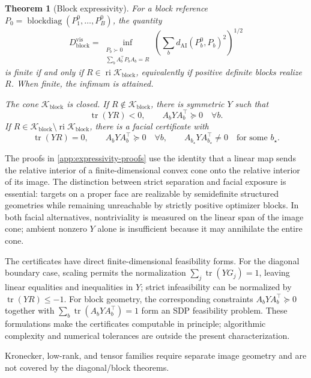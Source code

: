 \documentclass[10pt]{article}
\theoremstyle{plain}
\newtheorem{theorem}{Theorem}[section]
\theoremstyle{definition}
\theoremstyle{remark}
\newcommand{\AI}{\mathrm{AI}}
\newcommand{\tr}{\operatorname{tr}}
\newcommand{\blockdiag}{\operatorname{blockdiag}}
\newcommand{\ri}{\operatorname{ri}}
\newcommand{\dai}{d_{\AI}}
\newcommand{\Kcal}{\mathcal K}
\begin{document}
\begin{theorem}[Block expressivity]
\label{thm:block-expressivity}
For a block reference \(P_0=\blockdiag(P_1^0,\ldots,P_B^0)\), the quantity
\begin{equation}
  D_{\mathrm{block}}^{\mathrm{vis}}
  =
  \inf_{\substack{P_b\succ0\\\sum_bA_b^\top P_bA_b=R}}
  \left(\sum_b\dai(P_b^0,P_b)^2\right)^{1/2}
  \label{eq:block-complexity}
\end{equation}
is finite if and only if
\(R\in\ri\Kcal_{\mathrm{block}}\), equivalently if positive definite
blocks realize \(R\).  When finite, the infimum is attained.

The cone \(\Kcal_{\mathrm{block}}\) is closed.  If
\(R\notin\Kcal_{\mathrm{block}}\), there is symmetric \(Y\)
such that
\[
  \tr(YR)<0,
  \qquad
  A_bYA_b^\top\succeq0\quad\forall b.
\]
If
\(R\in\Kcal_{\mathrm{block}}\setminus
\ri\Kcal_{\mathrm{block}}\), there is a facial certificate with
\[
  \tr(YR)=0,
  \qquad
  A_bYA_b^\top\succeq0\quad\forall b,
  \qquad
  A_{b_\star}YA_{b_\star}^\top\ne0\quad\text{for some }b_\star.
\]
\end{theorem}

The proofs in \cref{app:expressivity-proofs} use the identity that a linear
map sends the relative interior of a finite-dimensional convex cone onto the
relative interior of its image.  The distinction between strict separation
and facial exposure is essential: targets on a proper face are realizable by
semidefinite structured geometries while remaining unreachable by strictly
positive optimizer blocks.  In both facial alternatives, nontriviality is
measured on the linear span of the image cone; ambient nonzero \(Y\) alone is
insufficient because it may annihilate the entire cone.

The certificates have direct finite-dimensional feasibility forms.  For the
diagonal boundary case, scaling permits the normalization
\(\sum_j\tr(YG_j)=1\), leaving linear equalities and inequalities in \(Y\);
strict infeasibility can be normalized by \(\tr(YR)\le-1\).  For block
geometry, the corresponding constraints
\(A_bYA_b^\top\succeq0\) together with
\(\sum_b\tr(A_bYA_b^\top)=1\) form an SDP feasibility problem.  These
formulations make the certificates computable in principle; algorithmic
complexity and numerical tolerances are outside the present characterization.

Kronecker, low-rank, and tensor families require separate image geometry and
are not covered by the diagonal/block theorems.
\end{document}

